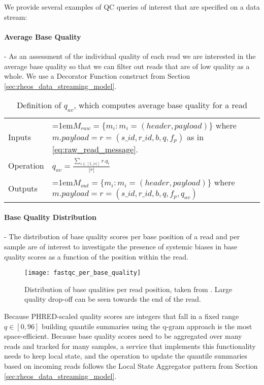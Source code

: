 We provide several examples of QC queries of interest that are specified on a data stream:

\paragraph{Average Base Quality} -  As an assessment of the individual quality of each read we are interested in the average base quality so that we can filter out reads that are of low quality as a whole. We use a Decorator Function construct from Section \ref{sec:rheos_data_streaming_model}. 

\bgroup
\def\arraystretch{1.5}
\begin{table}[!ht]
    \caption{Definition of $q_{av}$, which computes average base quality for a read}
    \label{tab:op_average_base_quality}
    {\begin{tabular}{l|p{12cm}}
    \toprule
    Inputs & \hangindent=1em$M_{raw} = \{m_i: m_i = (header, payload)\}$ where $m.payload = r = (s\_id, r\_id, b, q, f_p)$ as in \ref{eq:raw_read_message}.\\
    \cline{2-2}
    Operation & $q_{av} = \frac{\sum_{i \in [1,|r|]} r.q_i}{|r|}$\\
    \cline{2-2}
    {Outputs} & \hangindent=1em$M_{out} = \{m_i: m_i = (header, payload)\}$ where $m.payload = r = (s\_id, r\_id, b, q, f_p, q_{av})$\\
    \bottomrule
    \end{tabular}}
\end{table}
\egroup


\paragraph{Base Quality Distribution} - The distribution of base quality scores per base position of a read and per sample are of interest to investigate the presence of systemic biases in base quality scores as a function of the position within the read.

\begin{figure}[H]
    \texttt{[image: fastqc\_per\_base\_quality]}
    \centering
    \caption {Distribution of base qualities per read position, taken from \autocite{fastqc}. Large quality drop-off can be seen towards the end of the read.}
    \label{fig:main_body_fastqc_per_base_quality}
\end{figure} 

Because PHRED-scaled quality scores are integers that fall in a fixed range $q \in [0,96]$ building quantile summaries using the q-gram\autocite{shrivastava2004medians} approach is the most space-efficient. Because base quality scores need to be aggregated over many reads and tracked for many samples, a service that implements this functionality needs to keep local state, and the operation to update the quantile summaries based on incoming reads follows the Local State Aggregator pattern from Section \ref{sec:rheos_data_streaming_model}. 

